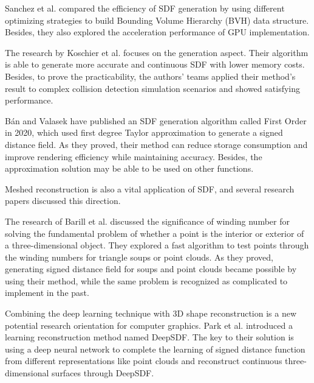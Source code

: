 \hspace*{\fill}

Sanchez et al. \cite{Sanchez2012EfficientEO} compared the efficiency of SDF generation by using different optimizing strategies to build Bounding Volume Hierarchy (BVH) data structure. Besides, they also explored the acceleration performance of GPU implementation.

\hspace*{\fill}

The research by Koschier et al. \cite{hpsdf} focuses on the generation aspect. Their algorithm is able to generate more accurate and continuous SDF with lower memory costs. Besides, to prove the practicability, the authors' teams applied their method's result to complex collision detection simulation scenarios and showed satisfying performance.

\hspace*{\fill}

Bán and Valasek \cite{firstorder} have published an SDF generation algorithm called First Order in 2020, which used first degree Taylor approximation to generate a signed distance field. As they proved, their method can reduce storage consumption and improve rendering efficiency while maintaining accuracy. Besides, the approximation solution may be able to be used on other functions.

\hspace*{\fill}

Meshed reconstruction is also a vital application of SDF, and several research papers discussed this direction.

\hspace*{\fill}

The research of Barill et al. \cite{windingnumber} discussed the significance of winding number for solving the fundamental problem of whether a point is the interior or exterior of a three-dimensional object. They explored a fast algorithm to test points through the winding numbers for triangle soups or point clouds. As they proved, generating signed distance field for soups and point clouds became possible by using their method, while the same problem is recognized as complicated to implement in the past.

\hspace*{\fill}

Combining the deep learning technique with 3D shape reconstruction is a new potential research orientation for computer graphics. Park et al. \cite{park2019deepsdf} introduced a learning reconstruction method named DeepSDF. The key to their solution is using a deep neural network to complete the learning of signed distance function from different representations like point clouds and reconstruct continuous three-dimensional surfaces through DeepSDF.


